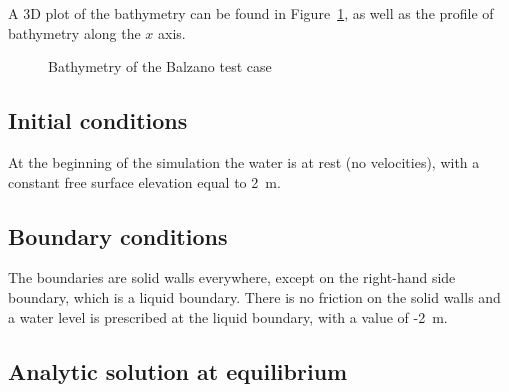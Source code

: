 A 3D plot of the bathymetry can be found in Figure~\ref{fig:balzano:bathy},
as well as the profile of bathymetry along the $x$ axis.

\begin{figure}[h!]
\begin{minipage}[t]{0.45\textwidth}
 \centering
\end{minipage}%
\begin{minipage}[t]{0.55\textwidth}
 \centering
\end{minipage}
\caption{Bathymetry of the Balzano test case}\label{fig:balzano:bathy}
\end{figure}

%

\subsection{Initial conditions}

At the beginning of the simulation the water is at rest (no velocities),
with a constant free surface elevation equal to 2~m.

\subsection{Boundary conditions}

The boundaries are solid walls everywhere, except on the right-hand side boundary, which is a liquid boundary.
There is no friction on the solid walls and a water level is prescribed at the liquid boundary, with a value of -2~m.

\subsection{Analytic solution at equilibrium}

